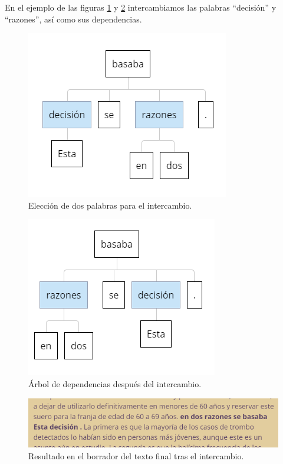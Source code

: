 En el ejemplo de las figuras \ref{fig:eleccionIntercambio} y  \ref{fig:intercambio} intercambiamos las palabras ``decisión'' y ``razones'', así como sus dependencias.
\begin{figure}[h!]
	\centering
	
	
	\includegraphics[scale=1]{Imagenes/Figuras/EleccionIntercambio}
	
	
	\caption{Elección de dos palabras para el intercambio.}
	\label{fig:eleccionIntercambio}
\end{figure}
\begin{figure}[h!]
	\centering
	
	
	\includegraphics[scale=1]{Imagenes/Figuras/IntercambioArbol}
	
	
	\caption{Árbol de dependencias después del intercambio.}
	\label{fig:intercambio}
\end{figure}
\begin{figure}[h!]
	\centering
	
	
	\includegraphics[scale=1]{Imagenes/Figuras/BorradorIntercambio}
	
	
	\caption{Resultado en el borrador del texto final tras el intercambio.}
	\label{fig:borradorIntercambio}
\end{figure}
